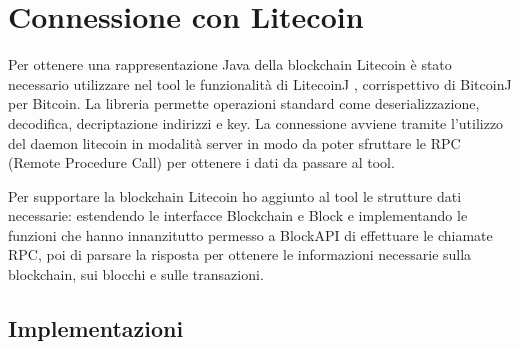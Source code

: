 \section{Connessione con Litecoin}
Per ottenere una rappresentazione Java della blockchain Litecoin è stato necessario utilizzare nel tool le funzionalità di LitecoinJ \cite{litecoinjgithub}, corrispettivo di BitcoinJ per Bitcoin. La libreria permette operazioni standard come deserializzazione, decodifica, decriptazione indirizzi e key.
La connessione avviene tramite l’utilizzo del daemon litecoin in modalità server in modo da poter sfruttare le RPC (Remote Procedure Call) per ottenere i dati da passare al tool.

Per supportare la blockchain Litecoin ho aggiunto al tool le strutture dati necessarie: estendendo le interfacce Blockchain e Block e implementando le funzioni che hanno innanzitutto permesso a BlockAPI di effettuare le chiamate RPC, poi di parsare la risposta per ottenere le informazioni necessarie sulla blockchain, sui blocchi e sulle transazioni.

\subsection{Implementazioni}



